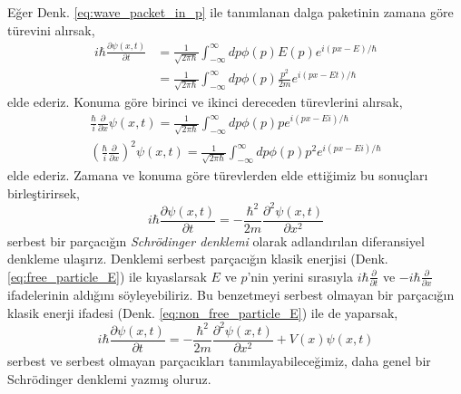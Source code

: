 \documentclass[a4paper,12pt, twoside]{article}
\begin{document}
Eğer Denk. \ref{eq:wave_packet_in_p} ile tanımlanan dalga paketinin zamana göre türevini alırsak,
\begin{align}
i \hbar \frac { \partial \psi ( x , t ) } { \partial t } &= \frac { 1 } { \sqrt { 2 \pi \hbar } } \int _ { - \infty } ^ { \infty } d p \phi ( p ) E ( p ) e ^ { i ( p x - E ) / \hbar } \nonumber\\
&= \frac { 1 } { \sqrt { 2 \pi \hbar } } \int _ { - \infty } ^ { \infty } d p \phi ( p ) \frac { p ^ { 2 } } { 2 m } e ^ { i ( p x - E t ) / \hbar }
\end{align}
elde ederiz. Konuma göre birinci ve ikinci dereceden türevlerini alırsak,
\begin{align}
\frac { \hbar } { i } \frac { \partial } { \partial x } \psi ( x , t ) = \frac { 1 } { \sqrt { 2 \pi \hbar } } \int _ { - \infty } ^ { \infty } d p \phi ( p ) p e ^ { i ( p x - E i )/\hbar }\nonumber\\
\left( \frac { \hbar } { i } \frac { \partial } { \partial x } \right) ^ { 2 } \psi ( x , t ) = \frac { 1 } { \sqrt { 2 \pi \hbar } } \int _ { - \infty } ^ { \infty } d p \phi ( p ) p ^ { 2 } e ^ { i ( p x - E i )/ \hbar }
\end{align}
elde ederiz. Zamana ve konuma göre türevlerden elde ettiğimiz bu sonuçları birleştirirsek,
\begin{equation}
i\hbar \dfrac {\partial \psi \left( x,t\right) }{\partial t}=-\dfrac {\hbar ^{2}}{2m}\dfrac {\partial ^{2}\psi \left( x,t\right) }{\partial x^{2}}
\label{eq:schrodinger_eq_free_particle}
\end{equation}
serbest bir parçacığın \emph{Schrödinger denklemi} olarak adlandırılan diferansiyel denkleme ulaşırız.
Denklemi serbest parçacığın klasik enerjisi (Denk. \ref{eq:free_particle_E}) ile kıyaslarsak $E$ ve $p$'nin yerini  sırasıyla $i \hbar \frac { \partial } { \partial t }$ ve $- i \hbar \frac { \partial } { \partial x }$ ifadelerinin aldığını söyleyebiliriz. Bu benzetmeyi serbest olmayan bir parçacığın klasik enerji ifadesi (Denk. \ref{eq:non_free_particle_E}) ile de yaparsak,
\begin{equation}
i\hbar \dfrac {\partial \psi \left( x,t\right) }{\partial t}=-\dfrac {\hbar ^{2}}{2m}\dfrac {\partial ^{2}\psi \left( x,t\right) }{\partial x^{2}}+V\left( x\right) \psi \left( x,t\right)
\label{eq:schrodinger_eq}
\end{equation}
serbest ve serbest olmayan parçacıkları tanımlayabileceğimiz, daha genel bir Schrödinger denklemi yazmış oluruz.
\end{document}
